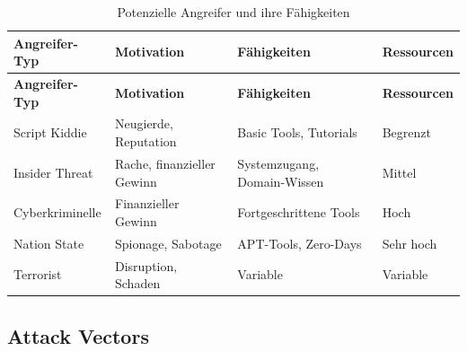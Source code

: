 \documentclass[11pt,a4paper]{article}
\begin{document}
\begin{longtable}{|l|p{4cm}|p{3cm}|p{4cm}|}
\caption{Potenzielle Angreifer und ihre Fähigkeiten} \\
\hline
\textbf{Angreifer-Typ} & \textbf{Motivation} & \textbf{Fähigkeiten} & \textbf{Ressourcen} \\
\hline
\endfirsthead
\hline
\textbf{Angreifer-Typ} & \textbf{Motivation} & \textbf{Fähigkeiten} & \textbf{Ressourcen} \\
\hline
\endhead
\hline
\endfoot
\hline
\endlastfoot

Script Kiddie & Neugierde, Reputation & Basic Tools, Tutorials & Begrenzt \\
\hline
Insider Threat & Rache, finanzieller Gewinn & Systemzugang, Domain-Wissen & Mittel \\
\hline
Cyberkriminelle & Finanzieller Gewinn & Fortgeschrittene Tools & Hoch \\
\hline
Nation State & Spionage, Sabotage & APT-Tools, Zero-Days & Sehr hoch \\
\hline
Terrorist & Disruption, Schaden & Variable & Variable \\
\hline
\end{longtable}

\subsection{Attack Vectors}
\end{document}
